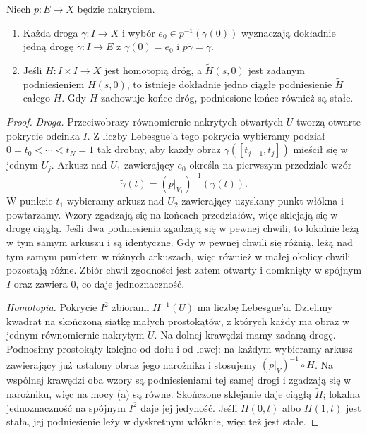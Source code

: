 \begin{twierdzenie}
\label{thm:podnoszenie-nakrycie}
Niech $p:E\to X$ będzie nakryciem.
\begin{enumerate}[label=(\alph*),leftmargin=*]
\item Każda droga $\gamma:I\to X$ i wybór
      $e_0\in p^{-1}(\gamma(0))$ wyznaczają
      dokładnie jedną drogę
      $\widetilde\gamma:I\to E$ z
      $\widetilde\gamma(0)=e_0$ i
      $p\widetilde\gamma=\gamma$.
\item Jeśli $H:I\times I\to X$ jest
      homotopią dróg, a $\widetilde H(s,0)$
      jest zadanym podniesieniem $H(s,0)$,
      to istnieje dokładnie jedno ciągłe
      podniesienie $\widetilde H$ całego $H$.
      Gdy $H$ zachowuje końce dróg,
      podniesione końce również są stałe.
\end{enumerate}
\end{twierdzenie}
\begin{proof}
\emph{Droga.} Przeciwobrazy równomiernie
nakrytych otwartych $U$ tworzą otwarte
pokrycie odcinka $I$. Z liczby Lebesgue'a
tego pokrycia wybieramy podział
$0=t_0<\cdots<t_N=1$ tak drobny, aby
każdy obraz $\gamma([t_{j-1},t_j])$
mieścił się w jednym $U_j$.
Arkusz nad $U_1$ zawierający $e_0$
określa na pierwszym przedziale wzór
\[
 \widetilde\gamma(t)
 =(p|_{V_1})^{-1}(\gamma(t)).
\]
W punkcie $t_1$ wybieramy arkusz nad $U_2$
zawierający uzyskany punkt włókna i powtarzamy.
Wzory zgadzają się na końcach przedziałów,
więc sklejają się w drogę ciągłą.
Jeśli dwa podniesienia zgadzają się w pewnej
chwili, to lokalnie leżą w tym samym arkuszu
i są identyczne. Gdy w pewnej chwili
się różnią, leżą nad tym samym punktem
w różnych arkuszach, więc również w małej
okolicy chwili pozostają różne. Zbiór
chwil zgodności jest zatem otwarty
i domknięty w spójnym $I$ oraz
zawiera $0$, co daje jednoznaczność.

\emph{Homotopia.} Pokrycie $I^2$ zbiorami
$H^{-1}(U)$ ma liczbę Lebesgue'a.
Dzielimy kwadrat na skończoną siatkę
małych prostokątów, z których każdy ma
obraz w jednym równomiernie nakrytym $U$.
Na dolnej krawędzi mamy zadaną drogę.
Podnosimy prostokąty kolejno od dołu i
od lewej: na każdym wybieramy arkusz
zawierający już ustalony obraz jego narożnika
i stosujemy $(p|_V)^{-1}\circ H$.
Na wspólnej krawędzi oba wzory są
podniesieniami tej samej drogi i zgadzają
się w narożniku, więc na mocy (a) są równe.
Skończone sklejanie daje ciągłą
$\widetilde H$; lokalna jednoznaczność
na spójnym $I^2$ daje jej jedyność.
Jeśli $H(0,t)$ albo $H(1,t)$ jest stała,
jej podniesienie leży w dyskretnym włóknie,
więc też jest stałe.
\end{proof}

